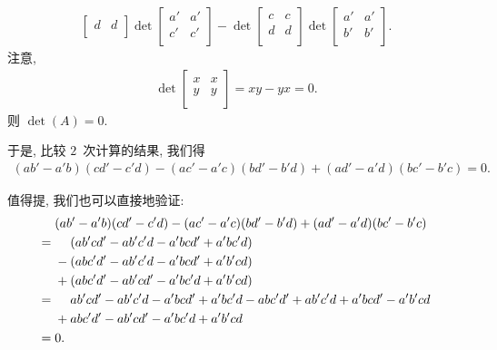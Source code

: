 \documentclass[../libro.tex]{subfiles}
\begin{document}
\begin{example}
\begin{align*}
{\begin{bmatrix}
                d & d \\
            \end{bmatrix}
        }
        \det {
            \begin{bmatrix}
                a' & a' \\
                c' & c' \\
            \end{bmatrix}
        }
        -
        \det {
            \begin{bmatrix}
                c & c \\
                d & d \\
            \end{bmatrix}
        }
        \det {
            \begin{bmatrix}
                a' & a' \\
                b' & b' \\
            \end{bmatrix}
        }.
    \end{align*}
    注意,
    \begin{align*}
        \det {
            \begin{bmatrix}
                x & x \\
                y & y \\
            \end{bmatrix}
        }
        = x y - y x = 0.
    \end{align*}
    则 \(\det {(A)} = 0\).

    于是, 比较 \(2\)~次计算的结果, 我们得
    \begin{align*}
        (a b' - a' b) (c d' - c' d)
        - (a c' - a' c) (b d' - b' d)
        + (a d' - a' d) (b c' - b' c)
        = 0.
    \end{align*}

    值得提, 我们也可以直接地验证:
    \begin{align*}
        &
        (a b' - a' b) (c d' - c' d)
        - (a c' - a' c) (b d' - b' d)
        + (a d' - a' d) (b c' - b' c)
        \\
        = {} &
        \hphantom{{} + {}}
        (a b' c d' - a b' c' d - a' b c d' + a' b c' d)
        \\
        &
        - (a b c' d' - a b' c' d - a' b c d' + a' b' c d)
        \\
        &
        + (a b c' d' - a b' c d' - a' b c' d + a' b' c d)
        \\
        = {} &
        \hphantom{{} + {}}
        a b' c d' - a b' c' d - a' b c d' + a' b c' d
        - a b c' d' + a b' c' d + a' b c d' - a' b' c d
        \\
        &
        + a b c' d' - a b' c d' - a' b c' d + a' b' c d
        \\
        = {} &
        0.
        \qefhere
    \end{align*}
\end{example}
\end{document}
